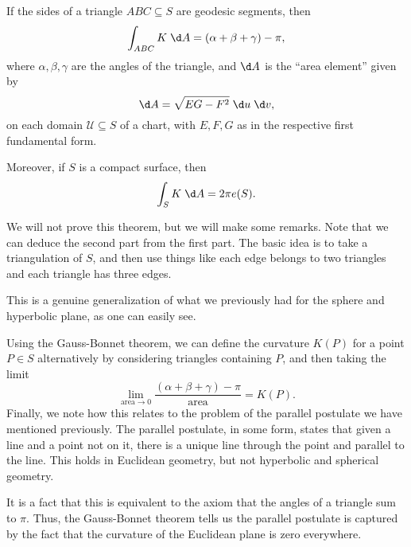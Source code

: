 \documentclass[a4paper]{article}
\begin{document}
\begin{thm}
  If the sides of a triangle $ABC \subseteq S$ are geodesic segments, then
  \[
    \int_{ABC} K \;\d A = (\alpha + \beta + \gamma) - \pi,
  \]
  where $\alpha, \beta, \gamma$ are the angles of the triangle, and $\d A$ is the ``area element'' given by
  \[
    \d A = \sqrt{EG - F^2} \;\d u\;\d v,
  \]
  on each domain $\mathcal{U} \subseteq S$ of a chart, with $E, F, G$ as in the respective first fundamental form.

  Moreover, if $S$ is a compact surface, then
  \[
    \int_S K\;\d A = 2\pi e(S).
  \]
\end{thm}
We will not prove this theorem, but we will make some remarks. Note that we can deduce the second part from the first part. The basic idea is to take a triangulation of $S$, and then use things like each edge belongs to two triangles and each triangle has three edges.

This is a genuine generalization of what we previously had for the sphere and hyperbolic plane, as one can easily see.

Using the Gauss-Bonnet theorem, we can define the curvature $K(P)$ for a point $P \in S$ alternatively by considering triangles containing $P$, and then taking the limit
\[
  \lim_{\text{area} \to 0} \frac{(\alpha + \beta + \gamma) - \pi}{\text{area}} = K(P).
\]
Finally, we note how this relates to the problem of the parallel postulate we have mentioned previously. The parallel postulate, in some form, states that given a line and a point not on it, there is a unique line through the point and parallel to the line. This holds in Euclidean geometry, but not hyperbolic and spherical geometry.

It is a fact that this is equivalent to the axiom that the angles of a triangle sum to $\pi$. Thus, the Gauss-Bonnet theorem tells us the parallel postulate is captured by the fact that the curvature of the Euclidean plane is zero everywhere.
\end{document}
